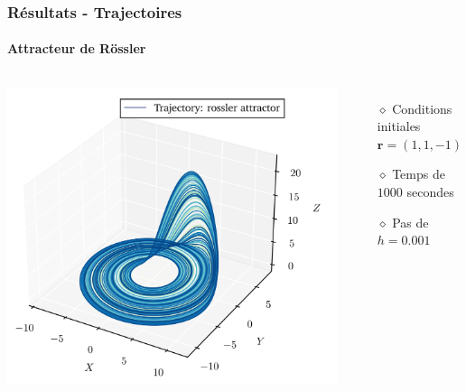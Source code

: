 \begin{frame}
    \frametitle{Résultats - Trajectoires}
    \framesubtitle{Attracteur de Rössler}
    \begin{columns}
        \centering
        \includegraphics[scale=0.6]{figures/trajectories/traj_rossler.png}
        \begin{itemize}
            \setlength\itemsep{1em}
            \item[$\diamond$] Conditions initiales $\bm{r} = (1, 1, -1)$ \\
            \item[$\diamond$] Temps de $1000$ secondes
            \item[$\diamond$] Pas de $h = 0.001$
        \end{itemize}
    \end{columns}
\end{frame}

